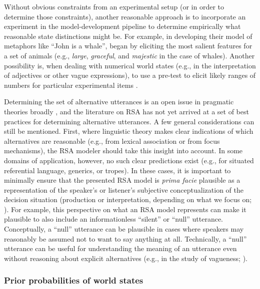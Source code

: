 \documentclass{sp}
\begin{document}
Without obvious constraints from an experimental setup (or in order to determine those constraints), another reasonable approach is to incorporate an experiment in the model-development pipeline to determine empirically what reasonable state distinctions might be. For example, in developing their model of metaphors like ``John is a whale'', \cite{kaoetal2014metaphor} began by eliciting the most salient features for a set of animals (e.g., \emph{large}, \emph{graceful}, and \emph{majestic} in the case of whales).
Another possibility is, when dealing with numerical world states (e.g., in the interpretation of adjectives or other vague expressions), to use a pre-test to elicit likely ranges of numbers for particular experimental items \citep[e.g.,][]{FrankeScholler2016:Semantic-values}.

Determining the set of alternative utterances is an open issue in pragmatic theories broadly \citep{ChemlaSingh2014:Remarks-on-the-,Katzir2007:Structurally-De,FoxKatzir2011:On-the-Characte}, and the literature on RSA has not yet arrived at a set of best practices for determining alternative utterances.
A few general considerations can still be mentioned.
First, where linguistic theory makes clear indications of which alternatives are reasonable (e.g., from lexical association or from focus mechanisms), the RSA modeler should take this insight into account.
In some domains of application, however, no such clear predictions exist (e.g., for situated referential language, generics, or tropes).
In these cases, it is important to minimally ensure that the presented RSA model is \emph{prima facie} plausible as a representation of the speaker's or listener's subjective conceptualization of the decision situation (production or interpretation, depending on what we focus on; \citealp{Franke2012:Pragmatic-Reaso}).
For example, this perspective on what an RSA model represents can make it plausible to also include an informationless ``silent'' or ``null'' utterance.
Conceptually, a ``null'' utterance can be plausible in cases where speakers may reasonably be assumed not to want to say anything at all.
Technically, a ``null'' utterance can be useful for understanding the meaning of an utterance even without reasoning about explicit alternatives (e.g., in the study of vagueness; \citealp{lassitergoodman2013}).


\subsubsection{Prior probabilities of world states}
\end{document}
